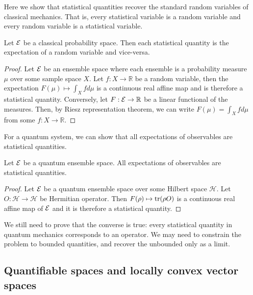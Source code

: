 Here we show that statistical quantities recover the standard random variables of classical mechanics. That is, every statistical variable is a random variable and every random variable is a statistical variable.

\begin{mathSection}
\begin{prop}
	Let $\mathcal{E}$ be a classical probability space. Then each statistical quantity is the expectation of a random variable and vice-versa.
\end{prop}

\begin{proof}
	Let $\mathcal{E}$ be an ensemble space where each ensemble is a probability measure $\mu$ over some sample space $X$. Let $f : X \to \mathbb{R}$ be a random variable, then the expectation $F(\mu) \mapsto \int_{X} f d\mu$ is a continuous real affine map and is therefore a statistical quantity. Conversely, let $F : \mathcal{E} \to \mathbb{R}$ be a linear functional of the measures. Then, by Riesz representation theorem, we can write $F(\mu) = \int_{X} f d\mu$ from some $f : X \to \mathbb{R}$.
\end{proof}
\end{mathSection}

For a quantum system, we can show that all expectations of observables are statistical quantities.

\begin{mathSection}
\begin{prop}
	Let $\mathcal{E}$ be a quantum ensemble space. All expectations of observables are statistical quantities.
\end{prop}

\begin{proof}
	Let $\mathcal{E}$ be a quantum ensemble space over some Hilbert space $\mathcal{H}$. Let $O : \mathcal{H} \to \mathcal{H}$ be Hermitian operator. Then $F(\rho) \mapsto \operatorname{tr}(\rho O)$ is a continuous real affine map of $\mathcal{E}$ and it is therefore a statistical quantity.
\end{proof}

\begin{remark}
	We still need to prove that the converse is true: every statistical quantity in quantum mechanics corresponds to an operator. We may need to constrain the problem to bounded quantities, and recover the unbounded only as a limit.
\end{remark}
\end{mathSection}


\subsection{Quantifiable spaces and locally convex vector spaces}

